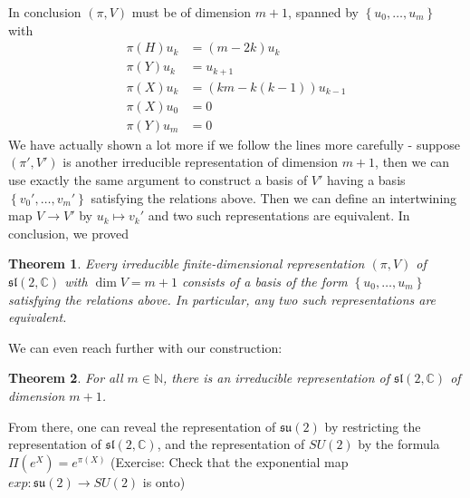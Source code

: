 \documentclass[11pt]{book}
\newtheorem{theorem}{Theorem}[section]
\newcommand{\bb}[1]{\mathbb{#1}}
\newcommand{\mf}[1]{\mathfrak{#1}}
\begin{document}
\noindent In conclusion $(\pi,V)$ must be of dimension $m+1$, spanned by $\left\{u_0, \dots, u_m\right\}$ with
\begin{align*}
\pi(H)u_k &= (m-2k)u_k\\
\pi(Y)u_k &= u_{k+1}\\
\pi(X)u_k &= (km-k(k-1))u_{k-1}\\
\pi(X)u_0 &= 0\\
\pi(Y)u_m &= 0
\end{align*}
We have actually shown a lot more if we follow the lines more carefully - suppose $(\pi',V')$ is another irreducible representation of dimension $m+1$, then we can use exactly the same argument to construct a basis of $V'$ having a basis $\left\{v_0', \dots, v_m'\right\}$ satisfying the relations above. Then we can define an intertwining map $V \to V'$ by $u_k \mapsto v_k'$ and two such representations are equivalent. In conclusion, we proved
\begin{theorem}
Every irreducible finite-dimensional representation $(\pi,V)$ of $\mf{sl}(2,\bb{C})$ with $\dim V = m+1$ consists of a basis of the form $\left\{u_0, \dots, u_m\right\}$ satisfying the relations above. In particular, any two such representations are equivalent.
\end{theorem}
We can even reach further with our construction:
\begin{theorem}
For all $m \in \bb{N}$, there is an irreducible representation of $\mf{sl}(2,\bb{C})$ of dimension $m+1$.
\end{theorem}
From there, one can reveal the representation of $\mf{su}(2)$ by restricting the representation of $\mf{sl}(2,\bb{C})$, and the representation of $SU(2)$ by the formula $\Pi(e^X) = e^{\pi(X)}$ (Exercise: Check that the exponential map $exp: \mf{su}(2) \to SU(2)$ is onto)
\end{document}
